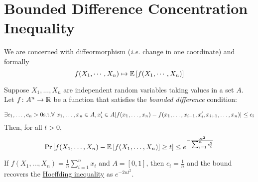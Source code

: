 \section{Bounded Difference Concentration Inequality}

We are concerned with diffeormorphism (\emph{i.e.} change in one coordinate) and formally 
\[
    f(X_1, \cdots, X_n) \mapsto \mathbb{E} \left[ f(X_1, \cdots, X_n) \right]
\]


\begin{theorem} \label{def:mcd_ineq}
    Suppose \(X_1, \ldots, X_n\) are independent random variables taking values in a set \(A\). 
    Let \(f \colon A^n \to \mathbb{R}\) be a function that satisfies the \emph{bounded difference} condition:

    \[
      \exists c_1, \ldots, c_n > 0 \text{s.t.} \forall \ x_1, \ldots, x_n \in A, x_i' \in A \\ 
      \lvert f(x_1, \ldots, x_n) - f(x_1, \ldots, x_{i-1}, x_i', x_{i+1}, \ldots, x_n) \rvert \leq c_i  
    \]
    Then, for all \(t > 0\),
    \[
        \Pr \left[ f(X_1, \ldots, X_n) - \mathbb{E} \left[ f(X_1, \ldots, X_n) \right] \geq t \right]
        \leq e^{- \frac{2t^2}{\sum_{i=1}^n c_i^2}}
    \]
\end{theorem}

\begin{remark}
    If \(f(X_1, \ldots, X_n) = \frac{1}{n}\sum_{i=1}^n x_i\) and \(A = [0, 1]\), then 
    \(c_i = \frac{1}{n}\) and the bound recovers the \hyperref[def:hoeffding_ineq]{Hoeffding inequality} 
    as \(e^{-2nt^2}\). 
\end{remark}